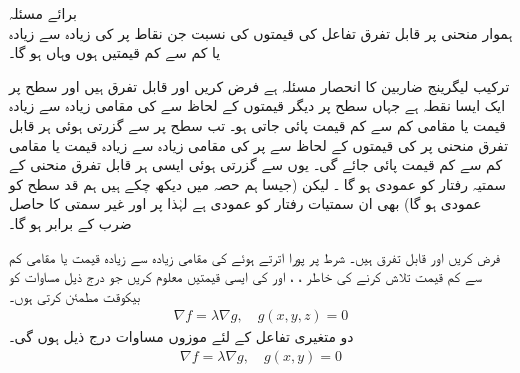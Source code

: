برائے مسئلہ \\
ہموار منحنی   پر   قابل تفرق تفاعل  کی قیمتوں کی نسبت  جن نقاط پر    کی زیادہ سے زیادہ یا کم سے کم قیمتیں ہوں وہاں  ہو گا۔

ترکیب لیگرینج  ضاربین کا انحصار مسئلہ  ہے فرض کریں  اور  قابل تفرق ہیں اور  سطح  پر  ایک ایسا نقطہ ہے  جہاں  سطح پر دیگر قیمتوں کے لحاظ سے  کی مقامی زیادہ سے زیادہ قیمت یا مقامی کم سے کم قیمت پائی جاتی ہو۔ تب  سطح  پر  سے  گزرتی ہوئی  ہر قابل تفرق منحنی پر   کی قیمتوں کے لحاظ  سے  پر  کی مقامی زیادہ سے زیادہ قیمت یا مقامی کم سے کم قیمت پائی جائے گی۔ یوں  سے گزرتی ہوئی ایسی ہر قابل تفرق  منحنی کے سمتیہ رفتار کو  عمودی ہو گا  ۔ لیکن   (جیسا ہم حصہ  میں دیکھ چکے ہیں   ہم قد سطح  کو عمودی ہو گا) بھی ان سمتیات  رفتار کو عمودی ہے لہٰذا  پر  اور غیر سمتی   کا حاصل ضرب  کے برابر ہو گا۔ 

فرض کریں  اور  قابل تفرق ہیں۔ شرط   پر پورا اترتے ہوئے  کی مقامی زیادہ سے زیادہ قیمت یا  مقامی کم سے کم قیمت تلاش کرنے کی خاطر  ، ،  اور  کی ایسی قیمتیں معلوم کریں جو درج ذیل مساوات کو  بیکوقت مطمئن کرتی  ہوں۔ 
\begin{align*}
\nabla f=\lambda \nabla g,\quad g(x,y,z)=0
\end{align*}
دو متغیری تفاعل  کے لئے موزوں مساوات درج ذیل ہوں گی۔
\begin{align*}
\nabla f=\lambda \nabla g,\quad g(x,y)=0
\end{align*}


